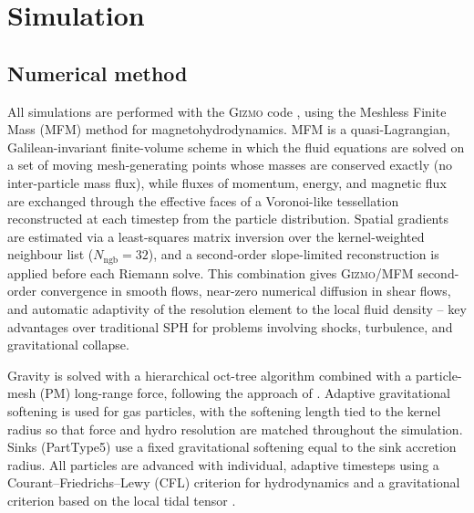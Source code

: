 
\section{Simulation}
\label{sec:simulation}

\subsection{Numerical method}
\label{sec:gizmo}

All simulations are performed with the \textsc{Gizmo} code
\citep{Hopkins2015}, using the Meshless Finite Mass (MFM) method for
magnetohydrodynamics.  MFM is a quasi-Lagrangian, Galilean-invariant
finite-volume scheme in which the fluid equations are solved on a set of
moving mesh-generating points whose masses are conserved exactly (no
inter-particle mass flux), while fluxes of momentum, energy, and magnetic
flux are exchanged through the effective faces of a Voronoi-like
tessellation reconstructed at each timestep from the particle distribution.
Spatial gradients are estimated via a least-squares matrix inversion over the
kernel-weighted neighbour list ($N_\mathrm{ngb} = 32$), and a second-order
slope-limited reconstruction is applied before each Riemann solve.  This
combination gives \textsc{Gizmo}/MFM second-order convergence in smooth
flows, near-zero numerical diffusion in shear flows, and automatic
adaptivity of the resolution element to the local fluid density -- key
advantages over traditional SPH for problems involving shocks, turbulence,
and gravitational collapse.

Gravity is solved with a hierarchical oct-tree algorithm combined with a
particle-mesh (PM) long-range force, following the approach of
\citet{Springel2005}.  Adaptive gravitational softening is used for gas
particles, with the softening length tied to the kernel radius so that
force and hydro resolution are matched throughout the simulation.  Sinks
(PartType5) use a fixed gravitational softening equal to the sink accretion
radius.  All particles are advanced with individual, adaptive timesteps
using a Courant--Friedrichs--Lewy (CFL) criterion for hydrodynamics and a
gravitational criterion based on the local tidal tensor \citep{Grudic2021}.

